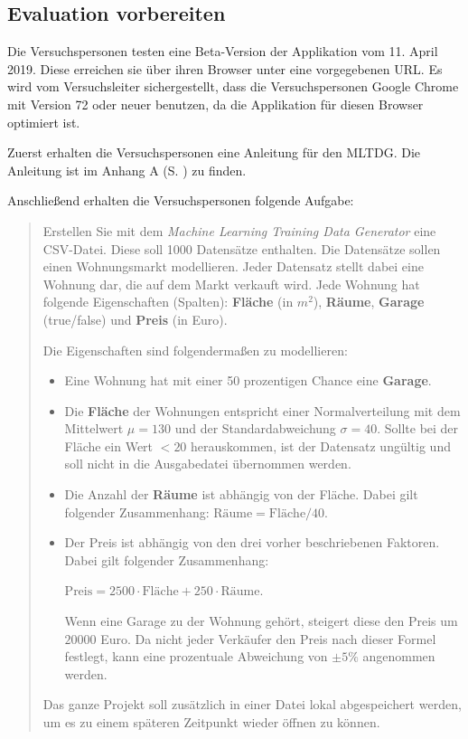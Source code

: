 \subsection{Evaluation vorbereiten}

Die Versuchspersonen testen eine Beta-Version der Applikation vom 11. April 2019. Diese erreichen sie über ihren Browser unter eine vorgegebenen URL. Es wird vom Versuchsleiter sichergestellt, dass die Versuchspersonen Google Chrome mit Version 72 oder neuer benutzen, da die Applikation für diesen Browser optimiert ist.

Zuerst erhalten die Versuchspersonen eine Anleitung für den \ac{MLTDG}. Die Anleitung ist im Anhang A (S. \pageref{apx:manual}) zu finden.

Anschließend erhalten die Versuchspersonen folgende Aufgabe:

\begin{quote}
    
    Erstellen Sie mit dem \textit{Machine Learning Training Data Generator} eine \ac{CSV}-Datei. Diese soll 1000 Datensätze enthalten. Die Datensätze sollen einen Wohnungsmarkt modellieren. Jeder Datensatz stellt dabei eine Wohnung dar, die auf dem Markt verkauft wird. Jede Wohnung hat folgende Eigenschaften (Spalten): \textbf{Fläche} (in $m^2$), \textbf{Räume}, \textbf{Garage} (true/false) und \textbf{Preis} (in Euro).

    Die Eigenschaften sind folgendermaßen zu modellieren:
    \begin{itemize}
        \item Eine Wohnung hat mit einer 50 prozentigen Chance eine \textbf{Garage}.
        \item Die \textbf{Fläche} der Wohnungen entspricht einer Normalverteilung mit dem Mittelwert $\mu = 130$ und der Standardabweichung $\sigma = 40$. Sollte bei der Fläche ein Wert $< 20$ herauskommen, ist der Datensatz ungültig und soll nicht in die Ausgabedatei übernommen werden.
        \item Die Anzahl der \textbf{Räume} ist abhängig von der Fläche. Dabei gilt folgender Zusammenhang: $\textrm{Räume} = \textrm{Fläche} / 40$.
        \item Der Preis ist abhängig von den drei vorher beschriebenen Faktoren. Dabei gilt folgender Zusammenhang:
        
        $\textrm{Preis} = 2500 \cdot \textrm{Fläche} + 250 \cdot \textrm{Räume}$.
        
        Wenn eine Garage zu der Wohnung gehört, steigert diese den Preis um $20000$ Euro. Da nicht jeder Verkäufer den Preis nach dieser Formel festlegt, kann eine prozentuale Abweichung von $\pm 5\%$ angenommen werden.
    \end{itemize}

    Das ganze Projekt soll zusätzlich in einer Datei lokal abgespeichert werden, um es zu einem späteren Zeitpunkt wieder öffnen zu können.

\end{quote}

